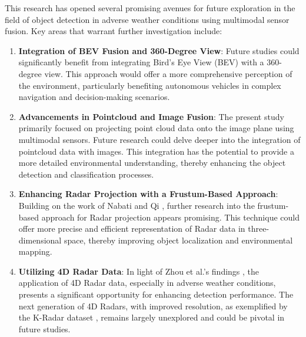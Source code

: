 \documentclass[report.tex]{subfiles}
\begin{document}



    This research has opened several promising avenues for future exploration in the field of object detection in adverse weather conditions using multimodal sensor fusion. Key areas that warrant further investigation include:

    \begin{enumerate}
        \item \textbf{Integration of BEV Fusion and 360-Degree View}: Future studies could significantly benefit from integrating Bird's Eye View (BEV) with a 360-degree view. This approach would offer a more comprehensive perception of the environment, particularly benefiting autonomous vehicles in complex navigation and decision-making scenarios.
        
        \item \textbf{Advancements in Pointcloud and Image Fusion}: The present study primarily focused on projecting point cloud data onto the image plane using multimodal sensors. Future research could delve deeper into the integration of pointcloud data with images. This integration has the potential to provide a more detailed environmental understanding, thereby enhancing the object detection and classification processes.
        
        \item \textbf{Enhancing Radar Projection with a Frustum-Based Approach}: Building on the work of Nabati and Qi \cite{nabati2021centerfusion}, further research into the frustum-based approach for Radar projection appears promising. This technique could offer more precise and efficient representation of Radar data in three-dimensional space, thereby improving object localization and environmental mapping.
        
        \item \textbf{Utilizing 4D Radar Data}: In light of Zhou et al.'s findings \cite{Zhou2022May}, the application of 4D Radar data, especially in adverse weather conditions, presents a significant opportunity for enhancing detection performance. The next generation of 4D Radars, with improved resolution, as exemplified by the K-Radar dataset \cite{Paek2022Jun}, remains largely unexplored and could be pivotal in future studies.
        

\end{enumerate}
\end{document}
